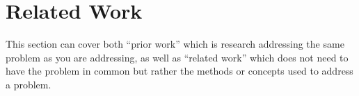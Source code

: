 \section{Related Work} \label{sec:related}

This section can cover both ``prior work'' which is research addressing the same problem as you are addressing, as well as ``related work'' which does not need to have the problem in common but rather the methods or concepts used to address a problem.
